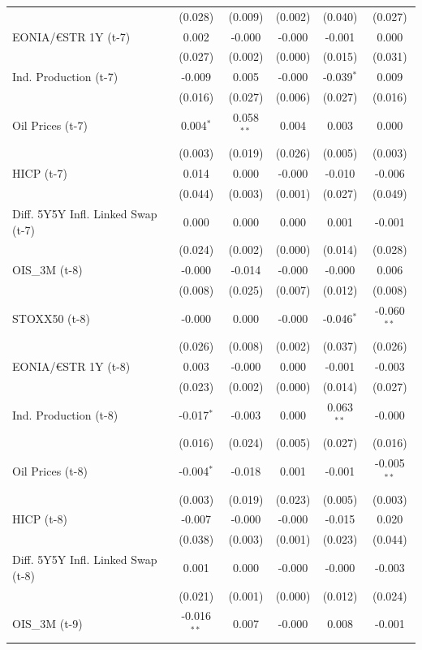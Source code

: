 \begin{longtable}[t]{lccccc}
 & (0.028) & (0.009) & (0.002) & (0.040) & (0.027)\\
EONIA/€STR 1Y (t-7) & 0.002 & -0.000 & -0.000 & -0.001 & 0.000\\
 & (0.027) & (0.002) & (0.000) & (0.015) & (0.031)\\
Ind. Production (t-7) & -0.009 & 0.005 & -0.000 & -0.039$^{*}$ & 0.009\\
 & (0.016) & (0.027) & (0.006) & (0.027) & (0.016)\\
Oil Prices (t-7) & 0.004$^{*}$ & 0.058$^{**}$ & 0.004 & 0.003 & 0.000\\
 & (0.003) & (0.019) & (0.026) & (0.005) & (0.003)\\
HICP (t-7) & 0.014 & 0.000 & -0.000 & -0.010 & -0.006\\
 & (0.044) & (0.003) & (0.001) & (0.027) & (0.049)\\
Diff. 5Y5Y Infl. Linked Swap (t-7) & 0.000 & 0.000 & 0.000 & 0.001 & -0.001\\
 & (0.024) & (0.002) & (0.000) & (0.014) & (0.028)\\
OIS\_3M (t-8) & -0.000 & -0.014 & -0.000 & -0.000 & 0.006\\
 & (0.008) & (0.025) & (0.007) & (0.012) & (0.008)\\
STOXX50 (t-8) & -0.000 & 0.000 & -0.000 & -0.046$^{*}$ & -0.060$^{**}$\\
 & (0.026) & (0.008) & (0.002) & (0.037) & (0.026)\\
EONIA/€STR 1Y (t-8) & 0.003 & -0.000 & 0.000 & -0.001 & -0.003\\
 & (0.023) & (0.002) & (0.000) & (0.014) & (0.027)\\
Ind. Production (t-8) & -0.017$^{*}$ & -0.003 & 0.000 & 0.063$^{**}$ & -0.000\\
 & (0.016) & (0.024) & (0.005) & (0.027) & (0.016)\\
Oil Prices (t-8) & -0.004$^{*}$ & -0.018 & 0.001 & -0.001 & -0.005$^{**}$\\
 & (0.003) & (0.019) & (0.023) & (0.005) & (0.003)\\
HICP (t-8) & -0.007 & -0.000 & -0.000 & -0.015 & 0.020\\
 & (0.038) & (0.003) & (0.001) & (0.023) & (0.044)\\
Diff. 5Y5Y Infl. Linked Swap (t-8) & 0.001 & 0.000 & -0.000 & -0.000 & -0.003\\
 & (0.021) & (0.001) & (0.000) & (0.012) & \vphantom{1} (0.024)\\
OIS\_3M (t-9) & -0.016$^{**}$ & 0.007 & -0.000 & 0.008 & -0.001\\

\end{longtable}
